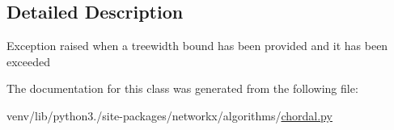\subsection{Detailed Description}
\begin{DoxyVerb}Exception raised when a treewidth bound has been provided and it has
been exceeded\end{DoxyVerb}
 

The documentation for this class was generated from the following file\+:\begin{DoxyCompactItemize}
\item 
venv/lib/python3./site-\/packages/networkx/algorithms/\hyperlink{chordal_8py}{chordal.\+py}\end{DoxyCompactItemize}

